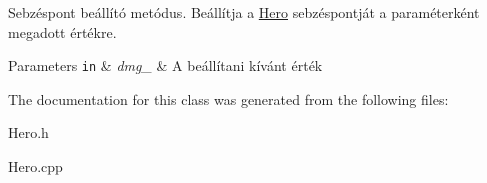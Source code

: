 Sebzéspont beállító metódus. Beállítja a \hyperlink{classHero}{Hero} sebzéspontját a paraméterként megadott értékre. 


\begin{DoxyParams}[1]{Parameters}
\mbox{\tt in}  & {\em dmg\+\_\+} & A beállítani kívánt érték \\
\hline
\end{DoxyParams}


The documentation for this class was generated from the following files\+:\begin{DoxyCompactItemize}
\item 
Hero.\+h\item 
Hero.\+cpp\end{DoxyCompactItemize}
